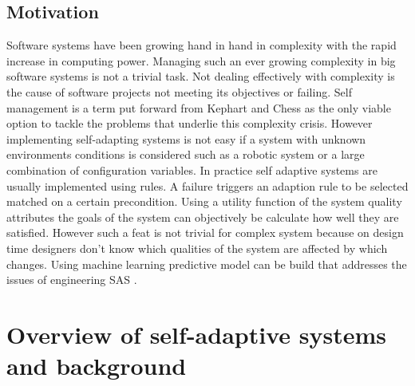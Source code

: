\documentclass[pdftex,english,oribibl]{llncs}
\begin{document}
\subsection{Motivation}
Software systems have been growing hand in hand in complexity with the rapid increase in computing power. Managing such an ever growing complexity in big software systems is not a trivial task. Not dealing effectively with complexity is the cause of software projects not meeting its objectives or failing. Self management is a term put forward from Kephart and Chess \cite{selfManagement} as the only viable option to tackle the problems that underlie this complexity crisis. However implementing self-adapting systems is not easy if a system with unknown environments conditions is considered such as a robotic system or a large combination of configuration variables. In practice self adaptive systems are usually implemented using rules. A failure triggers an adaption rule to be selected matched on a certain precondition. Using a utility function of the system quality attributes the goals of the system can objectively be calculate how well they are satisfied. However such a feat is not trivial for complex system because on design time designers don't know which qualities of the system are affected by which changes. Using machine learning predictive model can be build that addresses the issues of engineering SAS  \cite{ruleBasedSASystems}.

\section{Overview of self-adaptive systems and background}\label{sec:p1}
\end{document}
